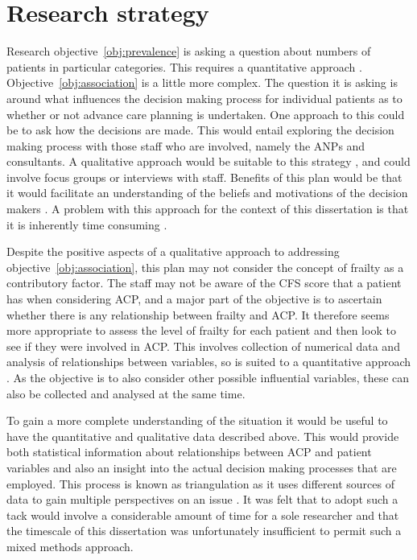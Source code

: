\documentclass
[
	12pt,
	a4paper,
	oneside,
]{report}
\begin{document}
\section{Research strategy}

Research objective~\ref{obj:prevalence} is asking a question about numbers
of patients in particular categories. This requires a quantitative approach
\parencite{biggam:15}.
Objective~\ref{obj:association} is a little more complex. The question it is 
asking is around what influences the decision making process for individual
patients as to whether or not advance care planning is undertaken. One 
approach to this could be to ask how the decisions are made. This would 
entail exploring the decision making process with those staff who are 
involved, namely the ANPs and consultants. A qualitative approach would
be suitable to this strategy \parencite{jolley:13}, and could involve 
focus groups or interviews with staff. Benefits of this plan would be that it 
would facilitate an understanding of the beliefs and motivations of the 
decision makers \parencite{parahoo:14}. A problem with this approach for the
context of this dissertation is that it is inherently time consuming
\parencite{jolley:13}.

Despite the positive aspects of a qualitative approach to addressing 
objective~\ref{obj:association}, this plan may not consider the concept of 
frailty
as a contributory factor. The staff may not be aware of the CFS score
that a patient has when considering ACP, and a major part of the objective
is to ascertain whether there is any relationship between frailty and ACP.
It therefore seems more appropriate to assess the level of frailty for each
patient and then look to see if they were involved in ACP. This involves
collection of numerical data and analysis of relationships between variables, 
so is suited to a quantitative approach \parencite{parahoo:14}. As the objective
is to also consider other possible influential variables, these can also
be collected and analysed at the same time.

To gain a more complete understanding of the situation it would be useful to 
have the quantitative and qualitative data described above. This would provide
both statistical information about relationships between ACP and patient
variables and also an insight into the actual decision making processes
that are employed. This process is known as triangulation as it uses different
sources of data to gain multiple perspectives on an issue 
\parencite{biggam:15}. It was felt that to adopt such a tack would involve a 
considerable amount of time for a sole researcher and that the timescale of 
this dissertation was unfortunately insufficient to permit such a mixed 
methods approach.
\end{document}
